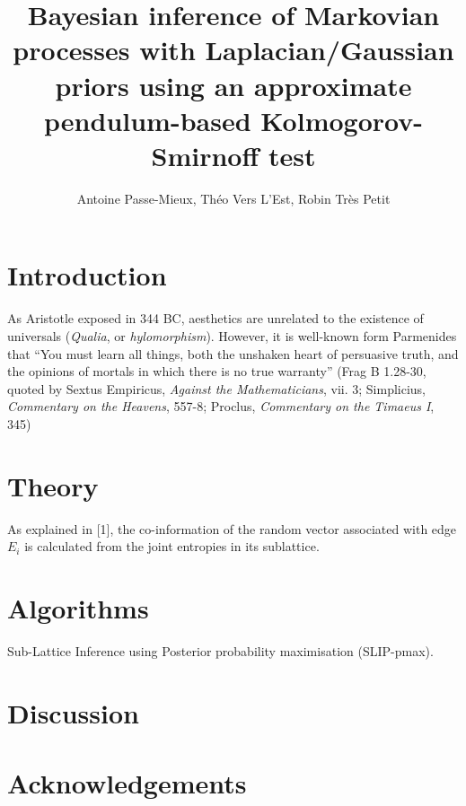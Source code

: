 \documentclass[a4paper]{article}
\author{Antoine Passe-Mieux, Théo Vers L'Est, Robin Très Petit}
\title{Bayesian inference of Markovian processes with Laplacian/Gaussian priors
using an approximate pendulum-based Kolmogorov-Smirnoff test}
\begin{document}
\maketitle

\section{Introduction}
As Aristotle exposed in 344 BC, aesthetics are unrelated to the existence of
universals (\emph{Qualia}, or \emph{hylomorphism}).
However, it is well-known form Parmenides that “You must learn all things, both the unshaken heart of persuasive truth, and the opinions of mortals in which there is no true warranty” (Frag B 1.28-30, quoted by Sextus Empiricus, \emph{Against the Mathematicians}, vii. 3; Simplicius, \emph{Commentary on the Heavens}, 557-8; Proclus, \emph{Commentary on the Timaeus I}, 345)

\section{Theory}
As explained in [1], the co-information of the random vector associated with
edge $E_i$ is calculated from the joint entropies in its sublattice.

\section{Algorithms}
Sub-Lattice Inference using Posterior probability maximisation (SLIP-pmax).

\section{Discussion}

\section{Acknowledgements}
\end{document}
